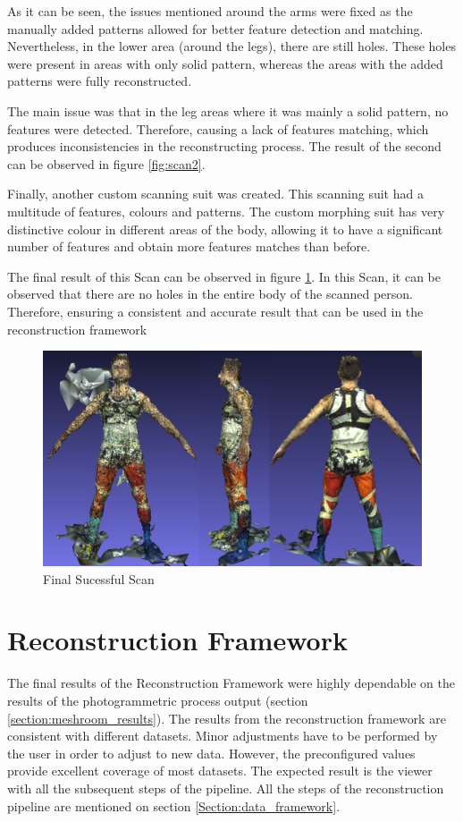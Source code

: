 \documentclass[12pt]{report}
\begin{document}
As it can be seen, the issues mentioned around the arms were fixed as the manually added patterns allowed for better feature detection and matching.
Nevertheless, in the lower area (around the legs), there are still holes. These holes were present in areas with only solid pattern, whereas the areas with the added patterns were fully reconstructed.
 
The main issue was that in the leg areas where it was mainly a solid pattern, no features were detected. Therefore, causing a lack of features matching, which produces inconsistencies in the reconstructing process. 
The result of the second can be observed in figure \ref{fig:scan2}.

Finally, another custom scanning suit was created. This scanning suit had a multitude of features, colours and patterns. 
The custom morphing suit has very distinctive colour in different areas of the body, allowing it to have a significant number of features and obtain more features matches than before.

The final result of this Scan can be observed in figure \ref{fig:scan3}. In this Scan, it can be observed that there are no holes in the entire body of the scanned person. 
Therefore, ensuring a consistent and accurate result that can be used in the reconstruction framework
 
\begin{figure}[H]%
  \centering
 \includegraphics[width=1\textwidth]{scan3.png}
\caption{Final Sucessful Scan}
\label{fig:scan3} 
\end{figure}








\newpage
\section{Reconstruction Framework}
The final results of the Reconstruction Framework were highly dependable on the results of the photogrammetric process output (section \ref{section:meshroom_results}). 
The results from the reconstruction framework are consistent with different datasets. Minor adjustments have to be performed by the user in order to adjust to new data. 
However, the preconfigured values provide excellent coverage of most datasets. 
The expected result is the viewer with all the subsequent steps of the pipeline. All the steps of the reconstruction pipeline are mentioned on section \ref{Section:data_framework}.
\end{document}
